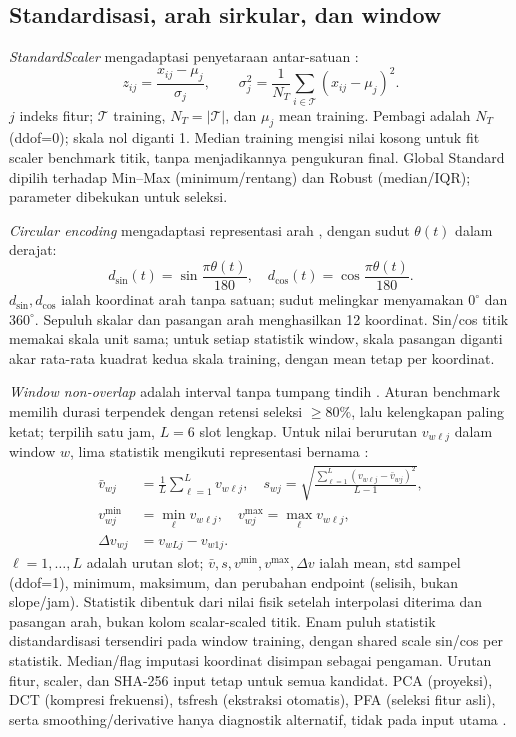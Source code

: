 \subsection{Standardisasi, arah sirkular, dan window}
\textit{StandardScaler} mengadaptasi penyetaraan antar-satuan \cite{mazgula2024,bette2023,li2026}:
\begin{equation}
z_{ij}=\frac{x_{ij}-\mu_j}{\sigma_j},\qquad
\sigma_j^2=\frac{1}{N_T}\sum_{i\in\mathcal T}(x_{ij}-\mu_j)^2.
\label{eq:zscore}
\end{equation}
$j$ indeks fitur; $\mathcal T$ training, $N_T=|\mathcal T|$, dan $\mu_j$ mean training. Pembagi adalah $N_T$ (ddof=0); skala nol diganti 1. Median training mengisi nilai kosong untuk fit scaler benchmark titik, tanpa menjadikannya pengukuran final. Global Standard dipilih terhadap Min--Max (minimum/rentang) dan Robust (median/IQR); parameter dibekukan untuk seleksi.

\textit{Circular encoding} mengadaptasi representasi arah \cite{cai2025,lang2026}, dengan sudut $\theta(t)$ dalam derajat:
\begin{equation}
d_{\sin}(t)=\sin\frac{\pi\theta(t)}{180},\quad d_{\cos}(t)=\cos\frac{\pi\theta(t)}{180}.
\label{eq:circular}
\end{equation}
$d_{\sin},d_{\cos}$ ialah koordinat arah tanpa satuan; sudut melingkar menyamakan $0^\circ$ dan $360^\circ$. Sepuluh skalar dan pasangan arah menghasilkan 12 koordinat. Sin/cos titik memakai skala unit sama; untuk setiap statistik window, skala pasangan diganti akar rata-rata kuadrat kedua skala training, dengan mean tetap per koordinat.

\textit{Window non-overlap} adalah interval tanpa tumpang tindih \cite{martipuig2024,bonifati2022,lang2026,bette2023}. Aturan benchmark memilih durasi terpendek dengan retensi seleksi $\geq80\%$, lalu kelengkapan paling ketat; terpilih satu jam, $L=6$ slot lengkap. Untuk nilai berurutan $v_{w\ell j}$ dalam window $w$, lima statistik mengikuti representasi bernama \cite{bonifati2022}:
\begin{align}
\bar v_{wj}&=\frac{1}{L}\sum_{\ell=1}^{L}v_{w\ell j},\quad
s_{wj}=\sqrt{\frac{\sum_{\ell=1}^{L}(v_{w\ell j}-\bar v_{wj})^2}{L-1}},\label{eq:windowstats}\\
v^{\min}_{wj}&=\min_\ell v_{w\ell j},\quad v^{\max}_{wj}=\max_\ell v_{w\ell j},\nonumber\\
\Delta v_{wj}&=v_{wLj}-v_{w1j}.\label{eq:endpoint}
\end{align}
$\ell=1,\ldots,L$ adalah urutan slot; $\bar v,s,v^{\min},v^{\max},\Delta v$ ialah mean, std sampel (ddof=1), minimum, maksimum, dan perubahan endpoint (selisih, bukan slope/jam). Statistik dibentuk dari nilai fisik setelah interpolasi diterima dan pasangan arah, bukan kolom scalar-scaled titik. Enam puluh statistik distandardisasi tersendiri pada window training, dengan shared scale sin/cos per statistik. Median/flag imputasi koordinat disimpan sebagai pengaman. Urutan fitur, scaler, dan SHA-256 input tetap untuk semua kandidat. PCA (proyeksi), DCT (kompresi frekuensi), tsfresh (ekstraksi otomatis), PFA (seleksi fitur asli), serta smoothing/derivative hanya diagnostik alternatif, tidak pada input utama \cite{bonifati2022,martipuig2024}.

